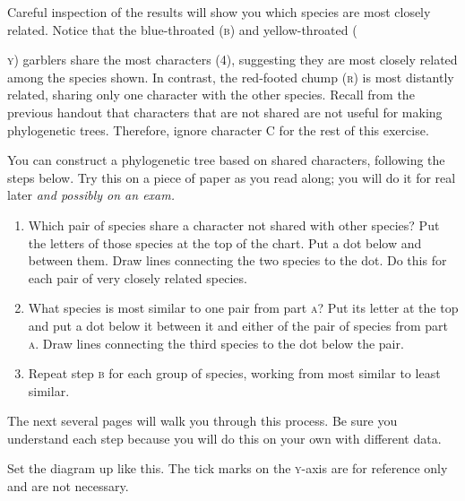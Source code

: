 \documentclass[12pt, addpoints]{exam}
\begin{document}
Careful inspection of the results will show you which species are most closely related. Notice that the blue-throated (\textsc{b}) and yellow-throated ({\textsc{y}) garblers share the most characters (4), suggesting they are most closely related among the species shown. In contrast, the red-footed chump (\textsc{r}) is most distantly related, sharing only one character with the other species. Recall from the previous handout that characters that are not shared are not useful for making phylogenetic trees. Therefore, ignore character C{} for the rest of this exercise.

You can construct a phylogenetic tree  based on shared characters, following the steps
below. Try this on a piece of paper as you read along; you will do it for
real later \emph{and possibly on an exam.} 

\begin{enumerate}%

\item Which pair of species share a character not shared with other species? 
Put the letters of those species at the top of the
chart. Put a dot below and between them. Draw lines connecting the two species to the
dot. Do this for each pair of very closely related species.

\item What species is most similar to one pair from part \textsc{a}? Put its letter
at the top and put a dot below it between it and either of the pair of species from part \textsc{a}.
Draw lines connecting the third species to the dot below the pair.

\item Repeat step \textsc{b} for each group of species, working from most similar to
least similar.

\end{enumerate}

The next several pages will walk you through this process. Be sure you understand each step because you will do this on your own with different data.

\newpage

Set the diagram up like this. The tick marks on the \textsc{y}-axis are for reference only and are not necessary.

}
\end{document}
